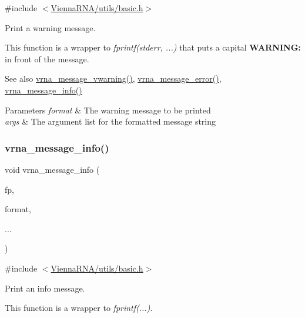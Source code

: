 {\ttfamily \#include $<$\mbox{\hyperlink{utils_2basic_8h}{Vienna\+R\+N\+A/utils/basic.\+h}}$>$}



Print a warning message. 

This function is a wrapper to {\itshape fprintf(stderr, ...)} that puts a capital {\bfseries{W\+A\+R\+N\+I\+NG\+:}} in front of the message.

\begin{DoxySeeAlso}{See also}
\mbox{\hyperlink{group__message__utils_ga377aa8ec8a49d343063adb22e6311f26}{vrna\+\_\+message\+\_\+vwarning()}}, \mbox{\hyperlink{group__message__utils_ga36b35be01d7f36cf7f59c245eee628d1}{vrna\+\_\+message\+\_\+error()}}, \mbox{\hyperlink{group__message__utils_ga039bae6153a6415b054dbe6045f83d03}{vrna\+\_\+message\+\_\+info()}}
\end{DoxySeeAlso}

\begin{DoxyParams}{Parameters}
{\em format} & The warning message to be printed \\
\hline
{\em args} & The argument list for the formatted message string \\
\hline
\end{DoxyParams}
\mbox{\label{group__message__utils_ga039bae6153a6415b054dbe6045f83d03}} 
\subsubsection{\texorpdfstring{vrna\_message\_info()}{vrna\_message\_info()}}
{\footnotesize\ttfamily void vrna\+\_\+message\+\_\+info (\begin{DoxyParamCaption}\item[{F\+I\+LE $\ast$}]{fp,  }\item[{const char $\ast$}]{format,  }\item[{}]{... }\end{DoxyParamCaption})}



{\ttfamily \#include $<$\mbox{\hyperlink{utils_2basic_8h}{Vienna\+R\+N\+A/utils/basic.\+h}}$>$}



Print an info message. 

This function is a wrapper to {\itshape fprintf(...)}.

